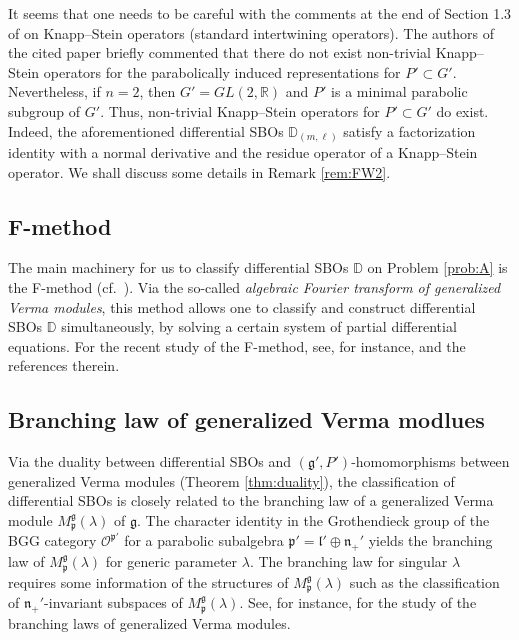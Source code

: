 \documentclass[reqno,11pt]{amsart}
\theoremstyle{remark}
\theoremstyle{definition}
\numberwithin{equation}{section}
\newcommand{\fg}{{\mathfrak g}}
\newcommand{\fl}{{\mathfrak l}}
\newcommand{\fn}{{\mathfrak n}}
\newcommand{\fp}{{\mathfrak p}}
\newcommand{\R}{\mathbb{R}}
\newcommand{\Cal}{\mathcal}
\newcommand{\Mp}{M^{\fg}_{\fp}}
\newcommand{\bD}{\mathbb{D}}
\begin{document}
It seems that one needs to be careful with the comments at the end of Section 1.3 of \cite{FW19} on Knapp--Stein operators (standard intertwining operators).
The authors of the cited paper briefly commented that
there do not exist non-trivial Knapp--Stein operators for 
the parabolically induced representations for $P' \subset G'$. 
Nevertheless, if $n=2$, then $G' = GL(2,\R)$ and $P'$ is a minimal parabolic
subgroup of $G'$. Thus, non-trivial Knapp--Stein operators for $P'\subset G'$ do 
exist. Indeed, the aforementioned differential SBOs $\bD_{(m,\ell)}$
satisfy a factorization identity with a normal derivative and the residue operator
of a Knapp--Stein operator. We shall discuss some details in Remark \ref{rem:FW2}.




\subsection{F-method}

The main machinery for us to classify differential SBOs $\bD$
on Problem \ref{prob:A} is the 
F-method (cf.\ \cite{FJS20, Kobayashi13, Kobayashi14, KKP16, KP1, KP2, KOSS15}).
Via the so-called \emph{algebraic Fourier transform of generalized Verma modules},
this method allows one to classify and construct differential SBOs $\bD$ simultaneously,
by solving a certain system of partial differential equations.
For the recent study of the F-method, see, for instance,  \cite{Frahm20, KuOr24, Nakahama19, Nakahama22, Nakahama23, Perez23} and the references therein.

\subsection{Branching law of generalized Verma modlues}

Via the duality between differential SBOs and $(\fg',P')$-homomorphisms
between generalized Verma modules (Theorem \ref{thm:duality}),
the classification of differential SBOs is closely related to the branching law
of a generalized Verma module $\Mp(\lambda)$ of $\fg$.
The character identity in the Grothendieck group of the BGG category $\Cal{O}^{\fp'}$
for a parabolic subalgebra $\fp' = \fl'\oplus \fn_+'$
yields the branching law of $\Mp(\lambda)$ for generic parameter $\lambda$.
The branching law for singular $\lambda$  requires 
some information of the structures 
of $\Mp(\lambda)$ such as the classification of $\fn_+'$-invariant subspaces of 
$\Mp(\lambda)$. See, for instance, \cite{Kobayashi12, KOSS15} 
for the study of the branching laws of generalized Verma modules.
\end{document}

